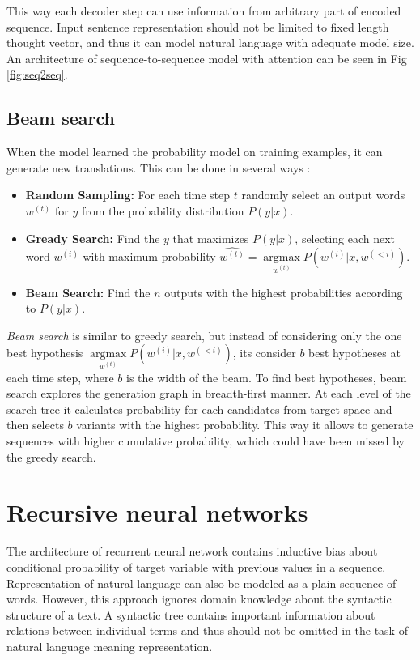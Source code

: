 This way each decoder step can use information from arbitrary part of encoded sequence. Input sentence representation should not be limited to fixed length thought vector, and thus it can model natural language with adequate model size. An architecture of sequence-to-sequence model with attention can be seen in Fig \ref{fig:seq2seq}.

\subsection{Beam search} \label{beam}
When the model learned the probability model on training examples, it can generate new translations. This can be done in several ways \parencite{Neubig2017}:
        \begin{itemize}
    	\item \textbf{Random Sampling:} For each time step $t$ randomly select an output words $w^{(t)}$ for $y$ from the probability distribution $P(y|x)$.
    	\item \textbf{Gready Search:} Find the $y$ that maximizes $P(y|x)$, selecting each next word $w^{(i)}$ with maximum probability $\hat{w^{(t)}} = \underset{w^{(t)}}{\operatorname{argmax}} P(w^{(i)}|x, w^{(<i)})$.
    	\item \textbf{Beam Search:} Find the $n$ outputs with the highest probabilities according to $P(y|x)$.
    \end{itemize}

\emph{Beam search} is similar to greedy search, but instead of considering only the one best hypothesis $\underset{w^{(t)}}{\operatorname{argmax}} P(w^{(i)}|x, w^{(<i)})$, its consider $b$ best hypotheses at each time step, where $b$ is the width of the beam. To find best hypotheses, beam search explores the generation graph in breadth-first manner. At each level of the search tree it calculates probability for each candidates from target space and then selects $b$ variants with the highest probability. This way it allows to generate sequences with higher cumulative probability, wchich could have been missed by the greedy search.

\section{Recursive neural networks} \label{sec:rvnn}
The architecture of recurrent neural network contains inductive bias about conditional probability of target variable with previous values in a sequence. Representation of natural language can also be modeled as a plain sequence of words. However, this approach ignores domain knowledge about the syntactic structure of a text. A syntactic tree contains important information about relations between individual terms and thus should not be omitted in the task of natural language meaning representation.


